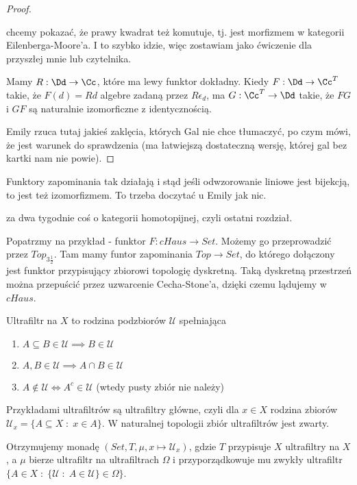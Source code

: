 \begin{proof}
  \begin{center}
  \end{center}
  chcemy pokazać, że prawy kwadrat też komutuje, tj. jest morfizmem w kategorii Eilenberga-Moore'a. I to szybko idzie, więc zostawiam jako ćwiczenie dla przyszłej mnie lub czytelnika.

  Mamy $R:\Dd\to\Cc$, które ma lewy funktor dokładny. Kiedy $F:\Dd\to \Cc^T$ takie, że $F(d)=Rd$ algebre zadaną przez $R\epsilon_d$, ma $G:\Cc^T\to\Dd$ takie, że $FG$ i $GF$ są naturalnie izomorficzne z identycznością.

  Emily rzuca tutaj jakieś zaklęcia, których Gal nie chce tłumaczyć, po czym mówi, że jest warunek do sprawdzenia (ma łatwiejszą dostateczną wersję, której gal bez kartki nam nie powie).
\end{proof}

Funktory zapominania tak działają i stąd jeśli odwzorowanie liniowe jest bijekcją, to jest też izomorfizmem. To trzeba doczytać u Emily jak nic.

za dwa tygodnie coś o kategorii homotopijnej, czyli ostatni rozdział.

\begin{example}
  Popatrzmy na przykład - funktor $F:cHaus\to Set$. Możemy go przeprowadzić przez $Top_{3\frac{1}{2}}$. Tam mamy funtor zapominania $Top\to Set$, do którego dołączony jest funktor przypisujący zbiorowi topologię dyskretną. Taką dyskretną przestrzeń można przepuścić przez uzwarcenie Cecha-Stone'a, dzięki czemu lądujemy w $cHaus$.

  Ultrafiltr na $X$ to rodzina podzbiorów $\mathcal{U}$ spełniająca
  \begin{enumerate}
    \item $A\subseteq B\in\mathcal{U}\implies B\in\mathcal{U}$
    \item $A,B\in\mathcal{U}\implies A\cap B\in\mathcal{U}$
    \item $A\notin \mathcal{U}\iff A^c\in\mathcal{U}$ (wtedy pusty zbiór nie należy)
  \end{enumerate}
  Przykładami ultrafiltrów są ultrafiltry główne, czyli dla $x\in X$ rodzina zbiorów $\mathcal{U}_x=\{A\subseteq X\;:\;x\in A\}$. W naturalnej topologii zbiór ultrafiltrów jest zwarty.

  Otrzymujemy monadę $(Set, T, \mu , x\mapsto \mathcal{U}_x)$, gdzie $T$ przypisuje $X$ ultrafiltry na $X$, a $\mu$ bierze ultrafiltr na ultrafiltrach $\Omega$ i przyporządkowuje mu zwykły ultrafiltr $\{A\in X\;:\;\{\mathcal{U}\;:\;A\in \mathcal{U}\}\in\Omega\}$.
\end{example}



